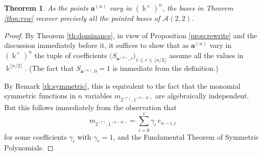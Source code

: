\documentclass{amsart}
\newtheorem{theorem}{Theorem}
\numberwithin{theorem}{section}
\newcommand{\bfa}{\boldsymbol{a}}
\newcommand{\cA}{\mathcal{A}}
\newcommand{\kk}{\Bbbk}
\begin{document}
  \begin{theorem}
    As the points $\bfa^{(n)}$ vary in $(\kk^\times)^n$, the bases in Theorem \ref{thm:rsw} recover precisely all the pointed bases of $\cA(2,2)$.
  \end{theorem}
  \begin{proof}
    By Theorem \ref{th:dominance}, in view of Proposition \ref{prop:rewrite} and the discussion immediately before it, it suffices to show that as $\bfa^{(n)}$ vary in $(\kk^\times)^n$ the tuple of coefficients $\big(S_{\bfa^{(n)},r}\big)_{1\leq r \leq \lfloor n/2\rfloor}$ assume all the values in $\kk^{\lfloor n/2\rfloor}$.
    (The fact that $S_{\bfa^{(n)},0}=1$ is immediate from the definition.)

    By Remark \ref{rk:symmetric}, this is equivalent to the fact that the monomial symmetric functions in $n$ variables $m_{2^{(r)},1^{(n-2r)}}$ are algebraically independent.
    But this follows immediately from the observation that 
    \[ 
      m_{2^{(r)},1^{(n-2r)}} = \sum_{i=0}^r \gamma_i\, e_{n-i,i}
    \]
    for some coefficients $\gamma_i$ with $\gamma_r=1$, and the Fundamental Theorem of Symmetric Polynomials. 
  \end{proof}



\end{document}
